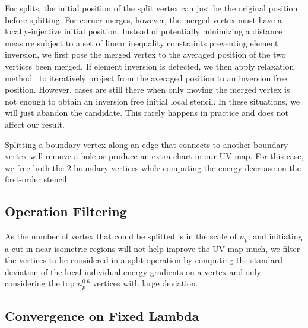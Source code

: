 For splits, the initial position of the split vertex can just be the original position before splitting. For corner merges, however, the merged vertex must have a locally-injective initial position. Instead of potentially minimizing a distance measure subject to a set of linear inequality constraints preventing element inversion, we first pose the merged vertex to the averaged position of the two vertices been merged. If element inversion is detected, we then apply relaxation method~\cite{Agmon1954Relaxation} to iteratively project from the averaged position to an inversion free position. However, cases are still there when only moving the merged vertex is not enough to obtain an inversion free initial local stencil. In these situations, we will just abandon the candidate. This rarely happens in practice and does not affect our result.

Splitting a boundary vertex along an edge that connects to another boundary vertex will remove a hole or produce an extra chart in our UV map. For this case, we free both the 2 boundary vertices while computing the energy decrease on the first-order stencil. 


\subsection{Operation Filtering}
\label{sec:operationFiltering}
As the number of vertex that could be splitted is in the scale of $n_p$, and initiating a cut in near-isometric regions will not help improve the UV map much, we filter the vertices to be considered in a split operation by computing the standard deviation of the local individual energy gradients on a vertex and only considering the top $n_p^{0.6}$ vertices with large deviation. 

\subsection{Convergence on Fixed Lambda}
\label{sec:convergence}


